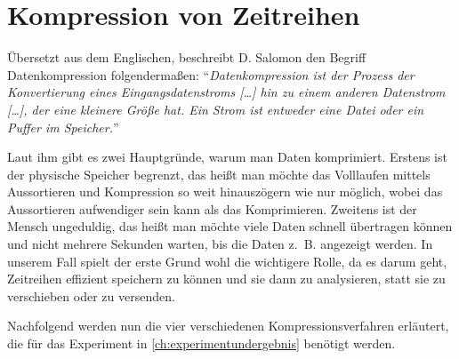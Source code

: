 \section{Kompression von Zeitreihen}
\newcommand{\tikztextl}[3]{\node at (#1, #2) {\rlap{\vphantom{/}\smash{#3}}};}
\newcommand{\tikztextc}[3]{\node at (#1, #2) {\vphantom{/}\smash{#3}};}
\newcommand{\tikztextr}[3]{\node at (#1, #2) {\llap{\vphantom{/}\smash{#3}}};}
\newcommand{\waveletfunction}[1]{%
 \begin{tikzpicture}[x = 20mm, y = 20mm]
  \useasboundingbox (-0.45, -1.5) rectangle (1.2, 1.7);
  \draw [->] (-0.1, 0) -- (1.2, 0);
  \draw [->] (0, -1.5) -- (0, 1.7);
  \tikztextr{1.2}{0.15}{$x$}
  \tikztextl{0.075}{1.65}{$y$}
  \tikztextc{0}{-0.15}{$0$}
  \tikztextc{0.5}{-0.15}{$0{,}5$}
  \tikztextc{1}{-0.15}{$1$}
  \tikztextr{-0.075}{-1.414}{$-\sqrt2$}
  \tikztextr{-0.075}{-1}{$-1$}
  \tikztextr{-0.075}{1}{$1$}
  \tikztextr{-0.075}{1.414}{$\sqrt2$}
  \draw [blue, thick] (-0.05, 0) -| #1 -- (1.05, 0);
 \end{tikzpicture}%
}
Übersetzt aus dem Englischen, beschreibt D. Salomon den Begriff Datenkompression \cite[p. 1-2]{dataCompressionSalmon} folgendermaßen: "`\textit{Datenkompression ist der Prozess der Konvertierung eines Eingangsdatenstroms [\ldots] hin zu einem anderen Datenstrom [\ldots], der eine kleinere Größe hat. Ein Strom ist entweder eine Datei oder ein Puffer im Speicher.}"'

Laut ihm gibt es zwei Hauptgründe, warum man Daten komprimiert. Erstens ist der physische Speicher begrenzt, das heißt man möchte das Volllaufen mittels Aussortieren und Kompression so weit hinauszögern wie nur möglich, wobei das Aussortieren aufwendiger sein kann als das Komprimieren. Zweitens ist der Mensch ungeduldig, das heißt man möchte viele Daten schnell übertragen können und nicht mehrere Sekunden warten, bis die Daten z.~B. angezeigt werden. In unserem Fall spielt der erste Grund wohl die wichtigere Rolle, da es darum geht, Zeitreihen effizient speichern zu können und sie dann zu analysieren, statt sie zu verschieben oder zu versenden.

Nachfolgend werden nun die vier verschiedenen Kompressionsverfahren erläutert, die für das Experiment in \autoref{ch:experimentundergebnis} benötigt werden.

